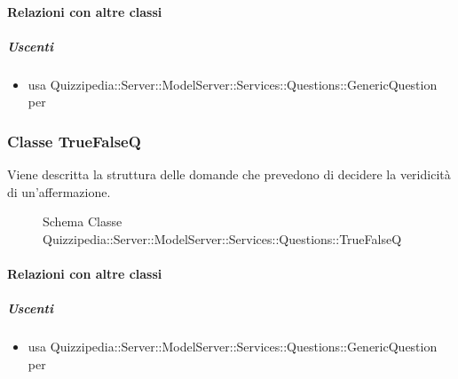 \paragraph{Relazioni con altre classi}
\subparagraph{Uscenti}
\begin{itemize}
\item usa Quizzipedia::Server::ModelServer::Services::Questions::GenericQuestion per 
\end{itemize}
\subsubsection{Classe TrueFalseQ}
Viene descritta la struttura delle domande che prevedono di decidere la veridicità di un'affermazione.
\begin{figure}[H]
\centering
\noindent{}
\caption[Schema Classe TrueFalseQ]{Schema Classe Quizzipedia::Server::ModelServer::Services::Questions::TrueFalseQ}
\end{figure}
\paragraph{Relazioni con altre classi}
\subparagraph{Uscenti}
\begin{itemize}
\item usa Quizzipedia::Server::ModelServer::Services::Questions::GenericQuestion per 
\end{itemize}
